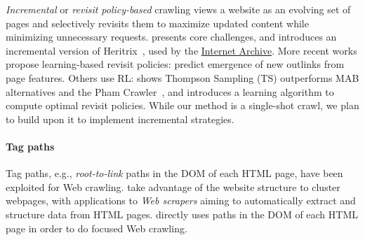 \begin{asparaenum}
\item \emph{Incremental} or \emph{revisit policy-based} crawling views a website as an evolving set of pages and selectively revisits them to maximize updated content while minimizing unnecessary requests. \cite{cho2000evolution} presents core challenges, and \cite{sigurdhsson2005incremental} introduces an incremental version of \textsf{\small Heritrix}~\cite{mohr2004introduction}, used by the \href{https://archive.org/}{Internet Archive}. More recent works propose learning-based revisit policies: \cite{dang2023look, avrachenkov2022online, kolobov2019optimal} predict emergence of new outlinks from page features. Others use RL: \cite{schulam2023improving} shows Thompson Sampling (TS) outperforms MAB alternatives and the \textsf{\small Pham Crawler}~\cite{pham2018learning}, and \cite{kolobov2019staying} introduces a learning algorithm to compute optimal revisit policies. While our method is a single-shot crawl, we plan to build upon it to implement incremental strategies.

\end{asparaenum}

\paragraph*{Tag paths} Tag paths, e.g., \emph{root-to-link} paths
in the DOM of each HTML page, have been exploited for Web crawling.
\cite{crescenzi2003fine, crescenzi2005clustering} take advantage of the website structure to cluster webpages, with applications to \emph{Web scrapers} aiming to automatically extract and structure data from HTML pages. \cite{faheem2015adaptive} directly uses paths in the DOM of each HTML page in order to do focused Web crawling.

